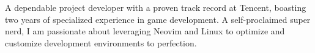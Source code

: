 

\begin{cvparagraph}
	A dependable project developer with a proven track record at Tencent, boasting two years of specialized experience in game development. A self-proclaimed super nerd, I am passionate about leveraging Neovim and Linux to optimize and customize development environments to perfection.
\end{cvparagraph}
